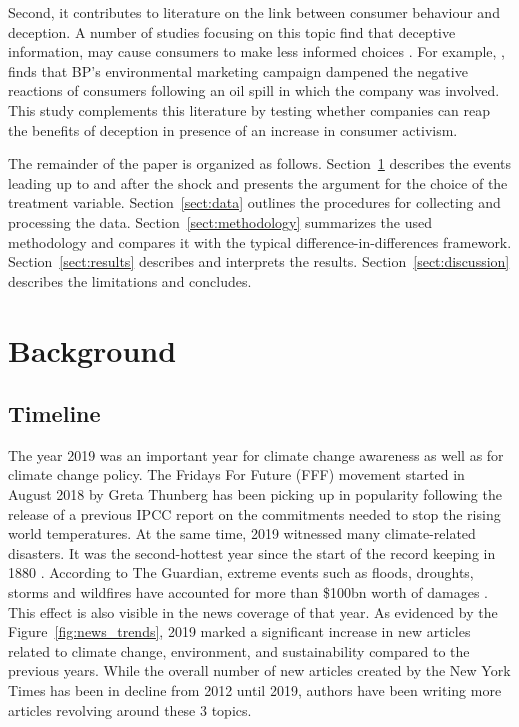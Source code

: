 \documentclass[12pt]{article}
\begin{document}
Second, it contributes to literature on the link between consumer behaviour and deception. A number of studies focusing on this topic find that deceptive information, may cause consumers to make less informed choices \parencite{raoDemandHealthyProducts2017,bronnenbergPharmacistsBuyBayer2015}. For example, \textcite{barrageAdvertisingEnvironmentalStewardship2020}, finds that BP's environmental marketing campaign dampened the negative reactions of consumers following an oil spill in which the company was involved. This study complements this literature by testing whether companies can reap the benefits of deception in presence of an increase in consumer activism.   

The remainder of the paper is organized as follows. Section~\ref{sect:background} describes the events leading up to and after the shock and presents the argument for the choice of the treatment variable. Section~\ref{sect:data} outlines the procedures for collecting and processing the data. Section~\ref{sect:methodology} summarizes the used methodology and compares it with the typical difference-in-differences framework. Section~\ref{sect:results} describes and interprets the results. Section~\ref{sect:discussion} describes the limitations and concludes.


\section{Background}\label{sect:background}

\subsection{Timeline} 

The year 2019 was an important year for climate change awareness as well as for climate change policy. The Fridays For Future (FFF) movement started in August 2018 by Greta Thunberg has been picking up in popularity following the release of a previous IPCC report on the commitments needed to stop the rising world temperatures. At the same time, 2019 witnessed many climate-related disasters. It was the second-hottest year since the start of the record keeping in 1880 \parencite{noaa2019global}. According to The Guardian, extreme events such as floods, droughts, storms and wildfires have accounted for more than \$100bn worth of damages \parencite{harvey2019climate}. This effect is also visible in the news coverage of that year. As evidenced by the Figure~\ref{fig:news_trends}, 2019 marked a significant increase in new articles related to climate change, environment, and sustainability compared to the previous years. While the overall number of new articles created by the New York Times has been in decline from 2012 until 2019, authors have been writing more articles revolving around these 3 topics. 
\end{document}
